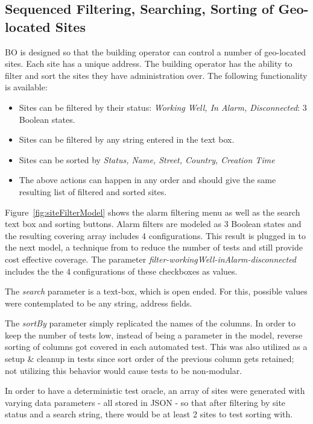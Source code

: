 \documentclass[conference]{IEEEtran}
\begin{document}
	\subsection{Sequenced Filtering, Searching, Sorting of Geo-located Sites}

	BO is designed so that the building operator can control a number of geo-located sites. 
	Each site has a unique address. The building operator has the ability to filter and sort the sites they have administration over.
	The following functionality is available:
	\begin{itemize}
		\item Sites can be filtered by their status: \textit{Working Well, In Alarm, Disconnected}: 3 Boolean states.
		\item Sites can be filtered by any string entered in the text box.
		\item Sites can be sorted by \textit{Status, Name, Street, Country, Creation Time}
		\item The above actions can happen in any order and should give the same resulting list of filtered and sorted sites.
	\end{itemize}

	Figure~\ref{fig:siteFilterModel} shows the alarm filtering menu as well as the search text box and sorting buttons. 
	Alarm filters are modeled as 3 Boolean states and the resulting covering array includes 4 configurations. 
	This result is plugged in to the next model, a technique from \cite{ozcan2017applications} to reduce the number of tests and still provide cost effective coverage.
	The parameter \textit{filter-workingWell-inAlarm-disconnected} includes the the 4 configurations of these checkboxes as values. 

	The \textit{search} parameter is a text-box, which is open ended. For this, possible values were contemplated to be any string, address fields.

	The \textit{sortBy} parameter simply replicated the names of the columns. 
	In order to keep the number of tests low, instead of being a parameter in the model, reverse sorting of columns got covered in each automated test.
	This was also utilized as a setup \& cleanup in tests since sort order of the previous column gets retained; not utilizing this behavior  would cause tests to be non-modular.

	In order to have a deterministic test oracle, an array of sites were generated with varying data parameters - all stored in JSON - so that after filtering by site status and a search string, there would be at least 2 sites to test sorting with.
	
\end{document}
